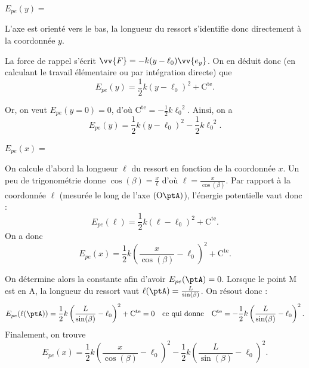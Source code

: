 \debutEntrainement


\begin{enonce}
$E_{pe}(y) = $
\end{enonce}


\begin{corrige}
L'axe est orienté vers le bas, la longueur du ressort s'identifie donc directement à la coordonnée $y$. 

La force de rappel s'écrit $\vv{F}=-k(y-\ell_0)\vv{e_y}$. On en déduit donc (en calculant le travail élémentaire ou par intégration directe) que 
\[
E_{pe}(y)=\frac{1}{2}k(y-\ell_0)^2 + \mathrm{C^{te}}.
\]

Or, on veut $E_{pe}(y=0)=0$, d'où $\mathrm{C^{te}}=-\frac{1}{2}k{\ell_0}^2$. Ainsi, on a
\[
E_{pe}(y) = \frac{1}{2}k(y-\ell_0)^2 -\frac{1}{2}k{\ell_0}^2.
\]
\end{corrige}




\begin{enonce}
$E_{pe}(x) = $
\end{enonce}


\begin{corrigeNewpage}
On calcule d'abord la longueur $\ell$ du ressort en fonction de la coordonnée $x$. Un peu de trigonométrie donne $\cos(\beta) = \frac{x}{\ell}$ d'où $\ell = \frac{x}{\cos(\beta)}$. Par rapport à la coordonnée $\ell$ (mesurée le long de l'axe $(\ptO\ptA)$), l'énergie potentielle vaut donc :
\[
E_{pe}(\ell) = \frac{1}{2}k(\ell-\ell_0)^2+\mathrm{C^{te}}.
\]
On a donc
\[
E_{pe}(x) = \frac{1}{2}k\left(\frac{x}{\cos(\beta)}-\ell_0\right)^2+\mathrm{C^{te}}.
\]

On détermine alors la constante afin d'avoir $E_{pe}(\ptA)=0$. Lorsque le point M est en A, la longueur du ressort vaut $\ell(\ptA)=\frac{L}{\sin(\beta)}$. On résout donc : \minusMedskip
\[
E_{pe}(\ell(\ptA)) = \frac{1}{2}k\left(\frac{L}{\sin(\beta)}-\ell_0\right)^2+\mathrm{C^{te}} = 0 
\quad\text{ce qui donne}\quad
\mathrm{C^{te}}=-\frac{1}{2}k\left(\frac{L}{\sin(\beta)}-\ell_0\right)^2.
\]
Finalement, on trouve
\[
E_{pe}(x)=\frac{1}{2}k\left(\frac{x}{\cos(\beta)}-\ell_0\right)^2-\frac{1}{2}k\left(\frac{L}{\sin(\beta)}-\ell_0\right)^2.
\]
\end{corrigeNewpage}

